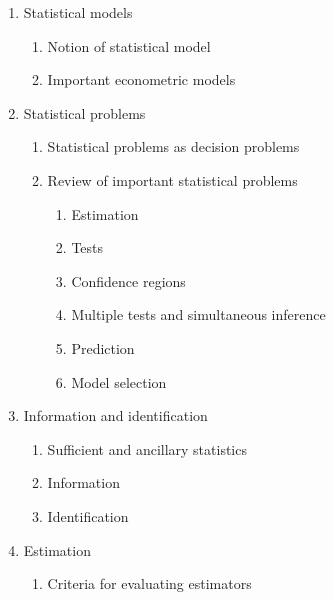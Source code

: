 \documentclass[titlepage,11pt,amstex]{article}
\begin{document}
\begin{enumerate}
\item Statistical models

\begin{enumerate}
\item \label{Notion of statistical model}Notion of statistical model

\item \label{Important econometric models}Important econometric models
\end{enumerate}

\item \label{Statistical models}Statistical problems

\begin{enumerate}
\item \label{Statistics and decision theory}Statistical problems as decision
problems

\item \label{R: Important statistical problems}Review of important
statistical problems

\begin{enumerate}
\item Estimation

\item Tests

\item Confidence regions

\item Multiple tests and simultaneous inference

\item Prediction

\item Model selection
\end{enumerate}
\end{enumerate}

\item Information and identification

\begin{enumerate}
\item Sufficient and ancillary statistics

\item Information

\item Identification
\end{enumerate}

\item Estimation

\begin{enumerate}
\item Criteria for evaluating estimators


\end{enumerate}
\end{enumerate}
\end{document}
